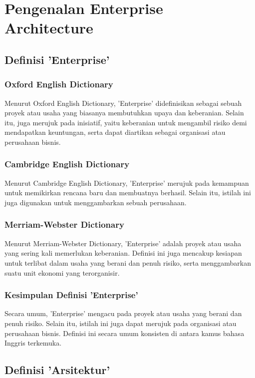 
\chapter{Pengenalan Enterprise Architecture}

\section{Definisi 'Enterprise'}

\subsection{Oxford English Dictionary}
Menurut Oxford English Dictionary, 'Enterprise' didefinisikan sebagai sebuah proyek atau usaha yang biasanya membutuhkan upaya dan keberanian. Selain itu, juga merujuk pada inisiatif, yaitu keberanian untuk mengambil risiko demi mendapatkan keuntungan, serta dapat diartikan sebagai organisasi atau perusahaan bisnis.

\subsection{Cambridge English Dictionary}
Menurut Cambridge English Dictionary, 'Enterprise' merujuk pada kemampuan untuk memikirkan rencana baru dan membuatnya berhasil. Selain itu, istilah ini juga digunakan untuk menggambarkan sebuah perusahaan.

\subsection{Merriam-Webster Dictionary}
Menurut Merriam-Webster Dictionary, 'Enterprise' adalah proyek atau usaha yang sering kali memerlukan keberanian. Definisi ini juga mencakup kesiapan untuk terlibat dalam usaha yang berani dan penuh risiko, serta menggambarkan suatu unit ekonomi yang terorganisir.

\subsection{Kesimpulan Definisi 'Enterprise'}
Secara umum, 'Enterprise' mengacu pada proyek atau usaha yang berani dan penuh risiko. Selain itu, istilah ini juga dapat merujuk pada organisasi atau perusahaan bisnis. Definisi ini secara umum konsisten di antara kamus bahasa Inggris terkemuka.

\section{Definisi 'Arsitektur'}

